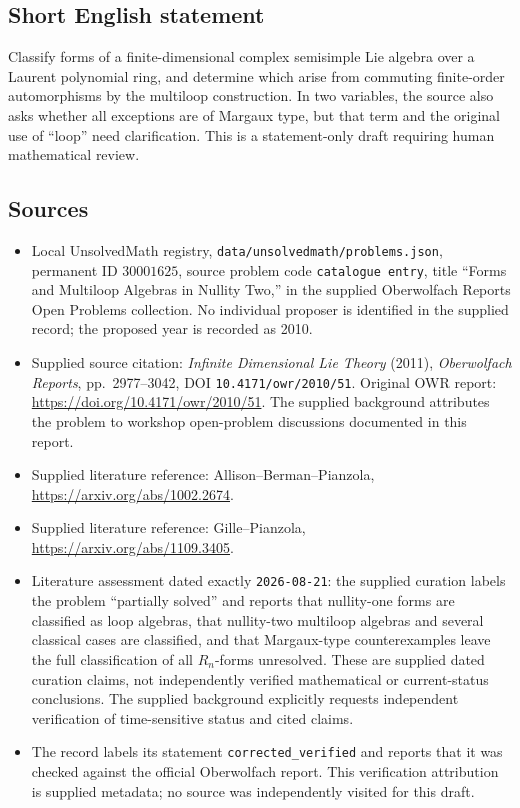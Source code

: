 \documentclass[11pt]{article}
\begin{document}
\subsection{Short English statement}
Classify forms of a finite-dimensional complex semisimple Lie algebra over a Laurent polynomial ring, and determine which arise from commuting finite-order automorphisms by the multiloop construction. In two variables, the source also asks whether all exceptions are of Margaux type, but that term and the original use of ``loop'' need clarification. This is a statement-only draft requiring human mathematical review.
\subsection{Sources}
\begin{itemize}
\item Local UnsolvedMath registry, \texttt{data/unsolvedmath/problems.json}, permanent ID \(30001625\), source problem code \texttt{catalogue entry}, title ``Forms and Multiloop Algebras in Nullity Two,'' in the supplied Oberwolfach Reports Open Problems collection. No individual proposer is identified in the supplied record; the proposed year is recorded as 2010.
\item Supplied source citation: \emph{Infinite Dimensional Lie Theory} (2011), \emph{Oberwolfach Reports}, pp.~2977--3042, DOI \texttt{10.4171/owr/2010/51}. Original OWR report: \url{https://doi.org/10.4171/owr/2010/51}. The supplied background attributes the problem to workshop open-problem discussions documented in this report.
\item Supplied literature reference: Allison--Berman--Pianzola, \url{https://arxiv.org/abs/1002.2674}.
\item Supplied literature reference: Gille--Pianzola, \url{https://arxiv.org/abs/1109.3405}.
\item Literature assessment dated exactly \texttt{2026-08-21}: the supplied curation labels the problem ``partially solved'' and reports that nullity-one forms are classified as loop algebras, that nullity-two multiloop algebras and several classical cases are classified, and that Margaux-type counterexamples leave the full classification of all \(R_n\)-forms unresolved. These are supplied dated curation claims, not independently verified mathematical or current-status conclusions. The supplied background explicitly requests independent verification of time-sensitive status and cited claims.
\item The record labels its statement \texttt{corrected\_verified} and reports that it was checked against the official Oberwolfach report. This verification attribution is supplied metadata; no source was independently visited for this draft.
\end{itemize}
\end{document}
